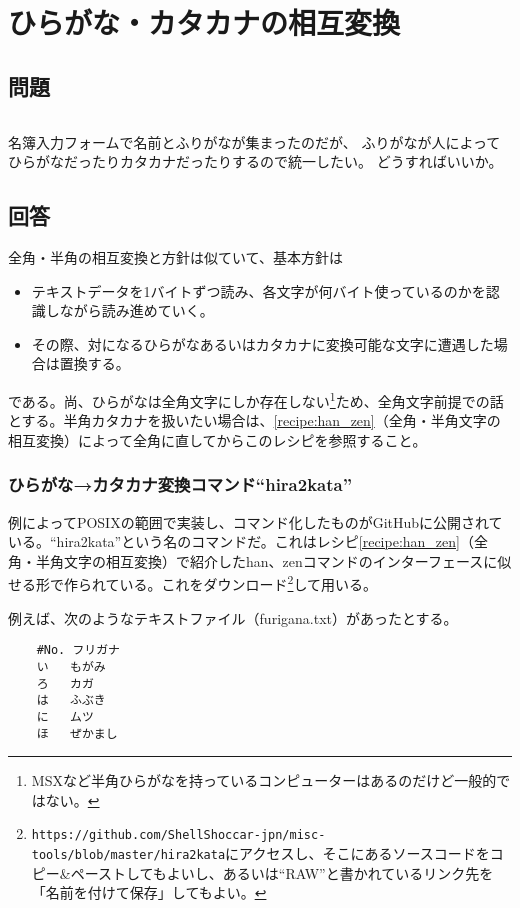 \section{ひらがな・カタカナの相互変換}
\label{recipe:hira_kata}

\subsection*{問題}
\noindent
$\!\!\!\!\!$
\begin{grshfboxit}{160.0mm}
	名簿入力フォームで名前とふりがなが集まったのだが、
	ふりがなが人によってひらがなだったりカタカナだったりするので統一したい。
	どうすればいいか。
\end{grshfboxit}

\subsection*{回答}
全角・半角の相互変換と方針は似ていて、基本方針は
\begin{itemize}
  \item テキストデータを1バイトずつ読み、各文字が何バイト使っているのかを認識しながら読み進めていく。
  \item その際、対になるひらがなあるいはカタカナに変換可能な文字に遭遇した場合は置換する。
\end{itemize}
である。尚、ひらがなは全角文字にしか存在しない\footnote{MSXなど半角ひらがなを持っているコンピューターはあるのだけど一般的ではない。}ため、全角文字前提での話とする。半角カタカナを扱いたい場合は、\ref{recipe:han_zen}（全角・半角文字の相互変換）によって全角に直してからこのレシピを参照すること。

\subsubsection*{ひらがな→カタカナ変換コマンド``hira2kata''}

例によってPOSIXの範囲で実装し、コマンド化したものがGitHubに公開されている。``hira2kata''という名のコマンドだ。これはレシピ\ref{recipe:han_zen}（全角・半角文字の相互変換）で紹介したhan、zenコマンドのインターフェースに似せる形で作られている。これをダウンロード\footnote{\verb|https://github.com/ShellShoccar-jpn/misc-tools/blob/master/hira2kata|にアクセスし、そこにあるソースコードをコピー\&{}ペーストしてもよいし、あるいは``RAW''と書かれているリンク先を「名前を付けて保存」してもよい。}して用いる。

例えば、次のようなテキストファイル（furigana.txt）があったとする。\\
\begin{frameboxit}{160.0mm}
\begin{verbatim}
	#No. フリガナ
	い   もがみ
	ろ   カガ
	は   ふぶき
	に   ムツ
	ほ   ぜかまし
\end{verbatim}
\end{frameboxit}

